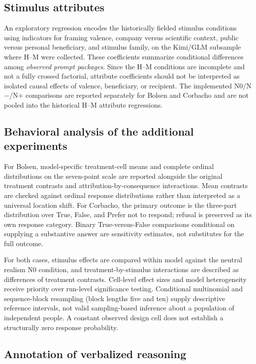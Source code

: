 \subsection{Stimulus attributes}

An exploratory regression encodes the historically fielded stimulus conditions using indicators for framing valence, company versus scientific context, public versus personal beneficiary, and stimulus family, on the Kimi/GLM subsample where H--M were collected. These coefficients summarize conditional differences among \emph{observed prompt packages}. Since the H--M conditions are incomplete and not a fully crossed factorial, attribute coefficients should not be interpreted as isolated causal effects of valence, beneficiary, or recipient. The implemented N0/N$-$/N$+$ comparisons are reported separately for Bolsen and Corbacho and are not pooled into the historical H--M attribute regressions.

\subsection{Behavioral analysis of the additional experiments}
For Bolsen, model-specific treatment-cell means and complete ordinal distributions on the seven-point scale are reported alongside the original treatment contrasts and attribution-by-consequence interactions. Mean contrasts are checked against ordinal response distributions rather than interpreted as a universal location shift. For Corbacho, the primary outcome is the three-part distribution over True, False, and Prefer not to respond; refusal is preserved as its own response category. Binary True-versus-False comparisons conditional on supplying a substantive answer are sensitivity estimates, not substitutes for the full outcome.

For both cases, stimulus effects are compared within model against the neutral realism N0 condition, and treatment-by-stimulus interactions are described as differences of treatment contrasts. Cell-level effect sizes and model heterogeneity receive priority over run-level significance testing. Conditional multinomial and sequence-block resampling (block lengths five and ten) supply descriptive reference intervals, not valid sampling-based inference about a population of independent people. A constant observed design cell does not establish a structurally zero response probability.

\subsection{Annotation of verbalized reasoning}

